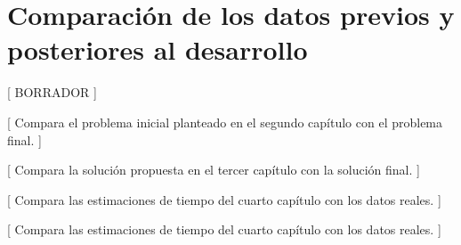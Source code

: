 \chapter{Comparación de los datos previos y posteriores al desarrollo}

[ BORRADOR ]

[ Compara el problema inicial planteado en el segundo capítulo con el problema final. ]

[ Compara la solución propuesta en el tercer capítulo con la solución final. ]

[ Compara las estimaciones de tiempo del cuarto capítulo con los datos reales. ]

[ Compara las estimaciones de tiempo del cuarto capítulo con los datos reales. ]


